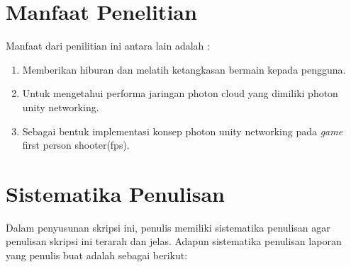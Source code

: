 
\section{Manfaat Penelitian}
Manfaat dari penilitian ini antara lain adalah : 
\begin{enumerate}
	\item Memberikan hiburan dan melatih ketangkasan bermain 
	kepada pengguna.
	\item Untuk mengetahui performa jaringan photon cloud yang dimiliki photon unity networking.
	\item Sebagai bentuk implementasi konsep photon unity networking pada \textit{\textit{game}} first person shooter(fps).
\end{enumerate}

\section{Sistematika Penulisan}
\noindent

Dalam penyusunan skripsi ini, penulis memiliki sistematika penulisan agar 
penulisan skripsi ini terarah dan jelas. Adapun sistematika penulisan laporan yang 
penulis buat adalah sebagai berikut:

